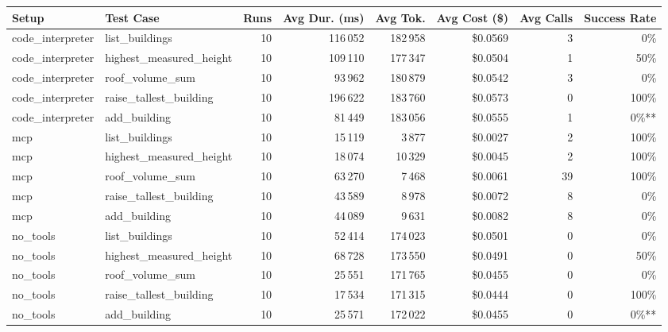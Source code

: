 \begin{table}[H]
\centering
\scriptsize

\begin{tabular}{l l r r r r r r}
\toprule
Setup & Test Case & Runs & Avg Dur. (ms) & Avg Tok. & Avg Cost (\$) & Avg Calls & Success Rate \\
\midrule
code\_interpreter & list\_buildings & 10 & 116\,052 & 182\,958 & \$0.0569 & 3 & 0\% \\
code\_interpreter & highest\_measured\_height & 10 & 109\,110 & 177\,347 & \$0.0504 & 1 & 50\% \\
code\_interpreter & roof\_volume\_sum & 10 & 93\,962 & 180\,879 & \$0.0542 & 3 & 0\% \\
code\_interpreter & raise\_tallest\_building & 10 & 196\,622 & 183\,760 & \$0.0573 & 0 & 100\% \\
code\_interpreter & add\_building & 10 & 81\,449 & 183\,056 & \$0.0555 & 1 & 0\%** \\
\midrule
mcp & list\_buildings & 10 & 15\,119 & 3\,877 & \$0.0027 & 2 & 100\% \\
mcp & highest\_measured\_height & 10 & 18\,074 & 10\,329 & \$0.0045 & 2 & 100\% \\
mcp & roof\_volume\_sum & 10 & 63\,270 & 7\,468 & \$0.0061 & 39 & 100\% \\
mcp & raise\_tallest\_building & 10 & 43\,589 & 8\,978 & \$0.0072 & 8 & 0\% \\
mcp & add\_building & 10 & 44\,089 & 9\,631 & \$0.0082 & 8 & 0\% \\
\midrule
no\_tools & list\_buildings & 10 & 52\,414 & 174\,023 & \$0.0501 & 0 & 0\% \\
no\_tools & highest\_measured\_height & 10 & 68\,728 & 173\,550 & \$0.0491 & 0 & 50\% \\
no\_tools & roof\_volume\_sum & 10 & 25\,551 & 171\,765 & \$0.0455 & 0 & 0\% \\
no\_tools & raise\_tallest\_building & 10 & 17\,534 & 171\,315 & \$0.0444 & 0 & 100\% \\
no\_tools & add\_building & 10 & 25\,571 & 172\,022 & \$0.0455 & 0 & 0\%** \\
\bottomrule
\end{tabular}
\end{table}
